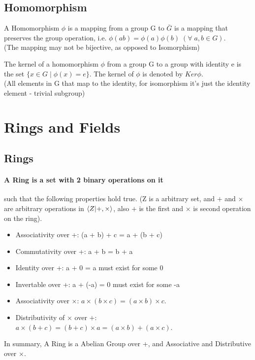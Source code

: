 \subsection{Homomorphism}

\begin{definition}
    A Homomorphism $\phi$ is a mapping from a group G to $\bar{G}$ is a mapping that preserves the group operation, i.e. $ \phi(ab) = \phi(a)\phi(b) \; (\forall\;a,b \in G)$. \\ 
    (The mapping may not be bijective, as opposed to Isomorphism)
\end{definition}

\begin{definition}
    The kernel of a homomorphism $\phi$ from a group G to a group with identity e is the set $\{x \in G\;|\;\phi(x) = e\}$. The kernel of $\phi$ is denoted by $Ker \phi$. \\
    (All elements in G that map to the identity, for isomorphism it's just the identity element - trivial subgroup)
\end{definition}


\section{Rings and Fields}

\subsection{Rings}

\paragraph{A Ring is a set with 2 binary operations on it} 
such that the following properties hold true. (Z is a arbitrary set, and 
$+$ and $\times$ are arbitrary operations in $\braket{ Z | +, \times }$, 
also $+$ is the first and $\times$ is second operation on the ring).
\begin{itemize}
    \item Associativity over +: (a + b) + c = a + (b + c)
    \item Commutativity over +: a + b = b + a
    \item Identity over +: a + 0 = a must exist for some 0
    \item Invertable over +: a + (-a) = 0 must exist for some -a
    \item Associativity over $\times$: $a \times (b \times c) = (a \times b) \times c$.
    \item Distributivity of $\times$ over $+$: $a \times (b + c) = (b + c) \times a = (a \times b) + (a \times c)$.
\end{itemize}
In summary, A Ring is a Abelian Group over +, and Associative and Distributive over $\times$.

